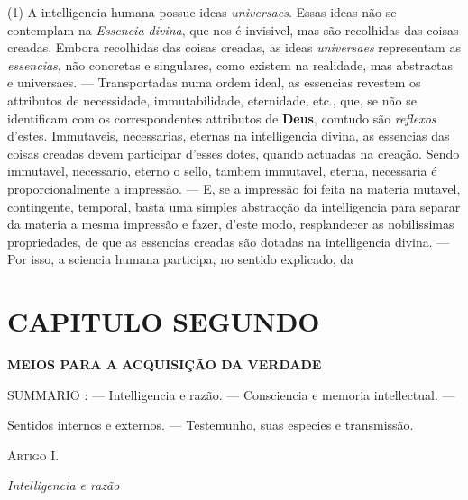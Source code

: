 (1) A intelligencia humana possue ideas \emph{universaes}. Essas ideas não se contemplam na \emph{Essencia divina}, que nos é invisivel, mas são recolhidas das coisas creadas. Embora recolhidas das coisas creadas, as ideas \emph{universaes} representam as \emph{essencias}, não concretas e singulares, como existem na realidade, mas abstractas e universaes. --- Transportadas numa ordem ideal, as essencias revestem os attributos de necessidade, immutabilidade, eternidade, etc., que, se não se identificam com os correspondentes attributos de \textbf{Deus}, comtudo são \emph{reflexos} d'estes. Immutaveis, necessarias, eternas na intelligencia divina, as essencias das coisas creadas devem participar d'esses dotes, quando actuadas na creação. Sendo immutavel, necessario, eterno o sello, tambem immutavel, eterna, necessaria é proporcionalmente a impressão. --- E, se a impressão foi feita na materia mutavel, contingente, temporal, basta uma simples abstracção da intelligencia para separar da materia a mesma impressão e fazer, d'este modo, resplandecer as nobilissimas propriedades, de que as essencias creadas são dotadas na intelligencia divina. --- Por isso, a sciencia humana participa, no sentido explicado, da


\chapter*{CAPITULO SEGUNDO}

   \textbf{MEIOS PARA A ACQUISIÇÃO DA VERDADE}

\textsc{SUMMARIO} : --- Intelligencia e razão. --- Consciencia e memoria intellectual. ---

Sentidos internos e externos. --- Testemunho, suas especies e transmissão.

\textsc{Artigo I.}

\emph{Intelligencia e razão}


